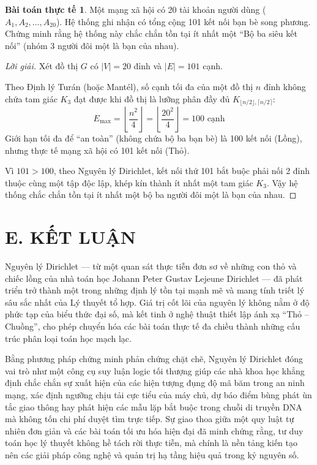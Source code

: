 \documentclass[12pt,a4paper]{article}
\theoremstyle{definition}
\newtheorem{example}{Bài toán thực tế}
\begin{document}
\vspace{0.5cm}

\begin{example}
Một mạng xã hội có 20 tài khoản người dùng ($A_1, A_2, \dots, A_{20}$). Hệ thống ghi nhận có tổng cộng 101 kết nối bạn bè song phương. Chứng minh rằng hệ thống này chắc chắn tồn tại ít nhất một ``Bộ ba siêu kết nối'' (nhóm 3 người đôi một là bạn của nhau).
\end{example}

\begin{proof}[Lời giải]
Xét đồ thị $G$ có $|V| = 20$ đỉnh và $|E| = 101$ cạnh.

\noindent Theo Định lý Turán (hoặc Mantél), số cạnh tối đa của một đồ thị $n$ đỉnh không chứa tam giác $K_3$ đạt được khi đồ thị là lưỡng phân đầy đủ $K_{\lfloor n/2 \rfloor, \lceil n/2 \rceil}$:
\[
E_{\max} = \left\lfloor \frac{n^2}{4} \right\rfloor = \left\lfloor \frac{20^2}{4} \right\rfloor = 100 \text{ cạnh}
\]
Giới hạn tối đa để ``an toàn'' (không chứa bộ ba bạn bè) là 100 kết nối (Lồng), nhưng thực tế mạng xã hội có 101 kết nối (Thỏ).

\noindent Vì $101 > 100$, theo Nguyên lý Dirichlet, kết nối thứ 101 bắt buộc phải nối 2 đỉnh thuộc cùng một tập độc lập, khép kín thành ít nhất một tam giác $K_3$. Vậy hệ thống chắc chắn tồn tại ít nhất một bộ ba người đôi một là bạn của nhau.
\end{proof}

\newpage

\section*{E. KẾT LUẬN}

Nguyên lý Dirichlet --- từ một quan sát thực tiễn đơn sơ về những con thỏ và chiếc lồng của nhà toán học Johann Peter Gustav Lejeune Dirichlet --- đã phát triển trở thành một trong những định lý tồn tại mạnh mẽ và mang tính triết lý sâu sắc nhất của Lý thuyết tổ hợp. Giá trị cốt lõi của nguyên lý không nằm ở độ phức tạp của biểu thức đại số, mà kết tinh ở nghệ thuật thiết lập ánh xạ ``Thỏ -- Chuồng'', cho phép chuyển hóa các bài toán thực tế đa chiều thành những cấu trúc phân loại toán học mạch lạc. 

\noindent Bằng phương pháp chứng minh phản chứng chặt chẽ, Nguyên lý Dirichlet đóng vai trò như một công cụ suy luận logic tối thượng giúp các nhà khoa học khẳng định chắc chắn sự xuất hiện của các hiện tượng đụng độ mã băm trong an ninh mạng, xác định ngưỡng chịu tải cực tiểu của máy chủ, dự báo điểm bùng phát ùn tắc giao thông hay phát hiện các mẫu lặp bắt buộc trong chuỗi di truyền DNA mà không tốn chi phí duyệt tìm trực tiếp. Sự giao thoa giữa một quy luật tự nhiên đơn giản và các bài toán tối ưu hóa hiện đại đã minh chứng rằng, tư duy toán học lý thuyết không hề tách rời thực tiễn, mà chính là nền tảng kiến tạo nên các giải pháp công nghệ và quản trị hạ tầng hiệu quả trong kỷ nguyên số.
\end{document}

